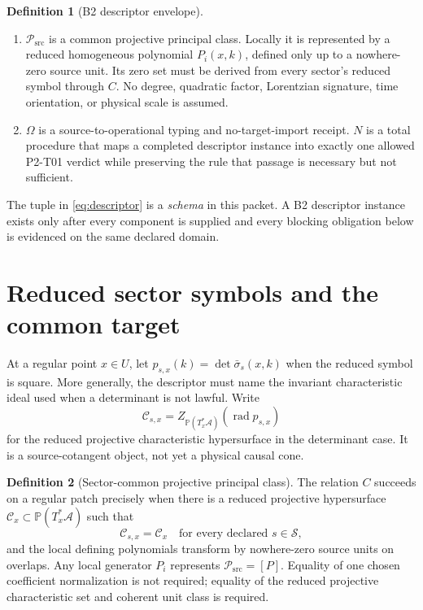\documentclass[11pt]{article}
\theoremstyle{definition}
\newtheorem{definition}{Definition}
\theoremstyle{plain}
\newcommand{\A}{\mathcal{A}}
\newcommand{\Sectors}{\mathcal{S}}
\newcommand{\Psrc}{\mathcal{P}_{\mathrm{src}}}
\newcommand{\Proj}{\mathbb{P}}
\newcommand{\Char}{\mathcal{C}}
\begin{document}
\begin{definition}[B2 descriptor envelope]
\begin{enumerate}[label=\textbf{D\arabic*.}]
  select a desired GR cone or target geometry.
  \item $\Psrc$ is a common projective principal class. Locally it is
  represented by a reduced homogeneous polynomial $P_i(x,k)$, defined only
  up to a nowhere-zero source unit. Its zero set must be derived from every
  sector's reduced symbol through $C$. No degree, quadratic factor,
  Lorentzian signature, time orientation, or physical scale is assumed.
  \item $\Omega$ is a source-to-operational typing and no-target-import
  receipt. $N$ is a total procedure that maps a completed descriptor instance
  into exactly one allowed P2-T01 verdict while preserving the rule that
  passage is necessary but not sufficient.
\end{enumerate}
\end{definition}

The tuple in \eqref{eq:descriptor} is a \emph{schema} in this packet. A B2
descriptor instance exists only after every component is supplied and every
blocking obligation below is evidenced on the same declared domain.

\section{Reduced sector symbols and the common target}

At a regular point $x\in U$, let
$p_{s,x}(k)=\det\bar\sigma_s(x,k)$ when the reduced symbol is square. More
generally, the descriptor must name the invariant characteristic ideal used
when a determinant is not lawful. Write
\[
 \Char_{s,x}=Z_{\Proj(T_x^*\A)}(\operatorname{rad}p_{s,x})
\]
for the reduced projective characteristic hypersurface in the determinant
case. It is a source-cotangent object, not yet a physical causal cone.

\begin{definition}[Sector-common projective principal class]
The relation $C$ succeeds on a regular patch precisely when there is a reduced
projective hypersurface $\Char_x\subset\Proj(T_x^*\A)$ such that
\begin{equation}
  \Char_{s,x}=\Char_x\quad\text{for every declared }s\in\Sectors,
  \label{eq:commonzero}
\end{equation}
and the local defining polynomials transform by nowhere-zero source units on
overlaps. Any local generator $P_i$ represents $\Psrc=[P]$. Equality of one
chosen coefficient normalization is not required; equality of the reduced
projective characteristic set and coherent unit class is required.
\end{definition}
\end{document}
